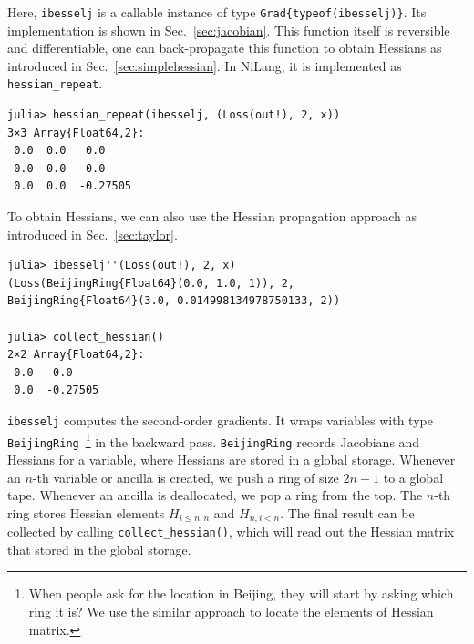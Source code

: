 \documentclass[aps,twocolumn,longbibliography,english,superscriptaddress]{revtex4-1}
\newcommand{\<}{\langle}
\renewcommand{\>}{\rangle}
\newcommand{\Fig}[1]{Fig.~\ref{#1}}
\newcommand{\Sec}[1]{Sec.~\ref{#1}}
\theoremstyle{definition}\newtheorem{definition}{\textit{Definition}}
\begin{document}
Here, \texttt{ibesselj\textquotesingle} is a callable instance of type \texttt{Grad\{typeof(ibesselj)\}}. Its implementation is shown in \Sec{sec:jacobian}. This function itself is reversible and differentiable, one can back-propagate this function to obtain Hessians as introduced in \Sec{sec:simplehessian}. In NiLang, it is implemented as \texttt{hessian\_repeat}.

\begin{minipage}{.44\textwidth}
\begin{lstlisting}
julia> hessian_repeat(ibesselj, (Loss(out!), 2, x))
3×3 Array{Float64,2}:
 0.0  0.0   0.0    
 0.0  0.0   0.0    
 0.0  0.0  -0.27505
\end{lstlisting}
\end{minipage}


To obtain Hessians, we can also use the Hessian propagation approach as introduced in \Sec{sec:taylor}.

\begin{minipage}{.44\textwidth}
\begin{lstlisting}
julia> ibesselj''(Loss(out!), 2, x)
(Loss(BeijingRing{Float64}(0.0, 1.0, 1)), 2, 
BeijingRing{Float64}(3.0, 0.014998134978750133, 2))

julia> collect_hessian()
2×2 Array{Float64,2}:
 0.0   0.0    
 0.0  -0.27505
\end{lstlisting}
\end{minipage}

\texttt{ibesselj\textquotesingle\textquotesingle} computes the second-order gradients. It wraps variables with type \texttt{BeijingRing}~\footnote{When people ask for the location in Beijing, they will start by asking which ring it is? We use the similar approach to locate the elements of Hessian matrix.} in the backward pass. \texttt{BeijingRing} records Jacobians and Hessians for a variable, where Hessians are stored in a global storage.
Whenever an $n$-th variable or ancilla is created, we push a ring of size $2n-1$ to a global tape. Whenever an ancilla is deallocated, we pop a ring from the top. The $n$-th ring stores Hessian elements $H_{i\leq n,n}$ and $H_{n,i<n}$.%
The final result can be collected by calling \texttt{collect\_hessian()}, which will read out the Hessian matrix that stored in the global storage.
\end{document}

